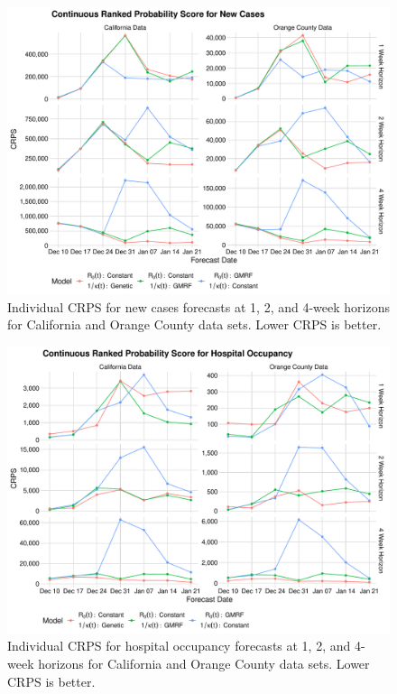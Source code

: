 \begin{figure}
    \centering
    \includegraphics[width=1.0\columnwidth]{real_data_crps_comparison_data_new_cases_plot}
    \caption{Individual CRPS for new cases forecasts at 1, 2, and 4-week horizons for California and Orange County data sets. Lower CRPS is better.}
    \label{ch_5:fig:real_data_crps_comparison_data_new_cases_plot}
\end{figure}

\begin{figure}
    \centering
    \includegraphics[width=1.0\columnwidth]{real_data_crps_comparison_data_hospitalizations_plot}
    \caption{Individual CRPS for hospital occupancy forecasts at 1, 2, and 4-week horizons for California and Orange County data sets. Lower CRPS is better.}
    \label{ch_5:fig:real_data_crps_comparison_data_hospitalizations_plot}
\end{figure}

